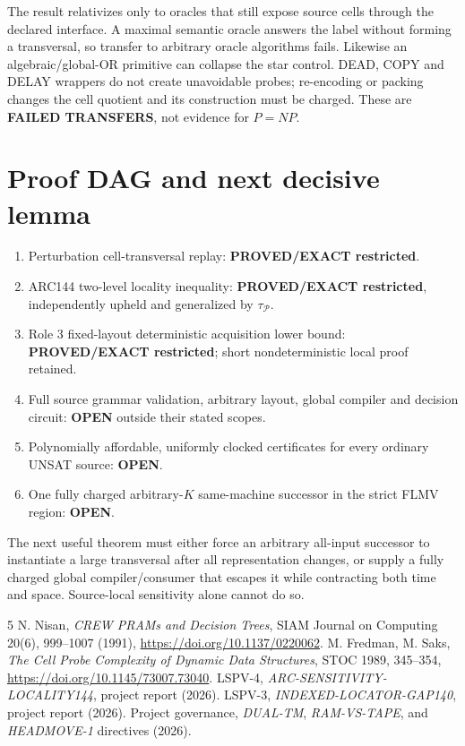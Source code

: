 \documentclass[11pt]{article}
\begin{document}
The result relativizes only to oracles that still expose source cells through
the declared interface.  A maximal semantic oracle answers the label without
forming a transversal, so transfer to arbitrary oracle algorithms fails.
Likewise an algebraic/global-OR primitive can collapse the star control.
DEAD, COPY and DELAY wrappers do not create unavoidable probes; re-encoding or
packing changes the cell quotient and its construction must be charged.
These are \textbf{FAILED TRANSFERS}, not evidence for $P=NP$.

\section{Proof DAG and next decisive lemma}
\begin{enumerate}
\item Perturbation cell-transversal replay: \textbf{PROVED/EXACT restricted}.
\item ARC144 two-level locality inequality: \textbf{PROVED/EXACT restricted},
independently upheld and generalized by $\tau_{\mathcal P}$.
\item Role 3 fixed-layout deterministic acquisition lower bound:
\textbf{PROVED/EXACT restricted}; short nondeterministic local proof retained.
\item Full source grammar validation, arbitrary layout, global compiler and
decision circuit: \textbf{OPEN} outside their stated scopes.
\item Polynomially affordable, uniformly clocked certificates for every
ordinary UNSAT source: \textbf{OPEN}.
\item One fully charged arbitrary-$K$ same-machine successor in the strict
FLMV region: \textbf{OPEN}.
\end{enumerate}
The next useful theorem must either force an arbitrary all-input successor to
instantiate a large transversal after all representation changes, or supply
a fully charged global compiler/consumer that escapes it while contracting
both time and space.  Source-local sensitivity alone cannot do so.

\begin{thebibliography}{5}
 N. Nisan, \emph{CREW PRAMs and Decision Trees}, SIAM Journal
on Computing 20(6), 999--1007 (1991),
\url{https://doi.org/10.1137/0220062}.
 M. Fredman, M. Saks, \emph{The Cell Probe Complexity of Dynamic
Data Structures}, STOC 1989, 345--354,
\url{https://doi.org/10.1145/73007.73040}.
 LSPV-4, \emph{ARC-SENSITIVITY-LOCALITY144}, project report
(2026).
 LSPV-3, \emph{INDEXED-LOCATOR-GAP140}, project report
(2026).
 Project governance, \emph{DUAL-TM}, \emph{RAM-VS-TAPE}, and
\emph{HEADMOVE-1} directives (2026).
\end{thebibliography}
\end{document}
